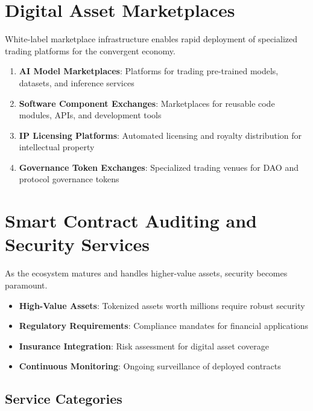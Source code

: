 \documentclass[11pt,a4paper]{report}
\begin{document}
\section{Digital Asset Marketplaces}

White-label marketplace infrastructure enables rapid deployment of specialized trading platforms for the convergent economy.

\begin{enumerate}
    \item \textbf{AI Model Marketplaces}: Platforms for trading pre-trained models, datasets, and inference services
    \item \textbf{Software Component Exchanges}: Marketplaces for reusable code modules, APIs, and development tools
    \item \textbf{IP Licensing Platforms}: Automated licensing and royalty distribution for intellectual property
    \item \textbf{Governance Token Exchanges}: Specialized trading venues for DAO and protocol governance tokens
\end{enumerate}

\section{Smart Contract Auditing and Security Services}

As the ecosystem matures and handles higher-value assets, security becomes paramount.

\begin{keypoint}
\begin{itemize}
    \item \textbf{High-Value Assets}: Tokenized assets worth millions require robust security
    \item \textbf{Regulatory Requirements}: Compliance mandates for financial applications
    \item \textbf{Insurance Integration}: Risk assessment for digital asset coverage
    \item \textbf{Continuous Monitoring}: Ongoing surveillance of deployed contracts
\end{itemize}
\end{keypoint}

\subsection{Service Categories}
\end{document}
